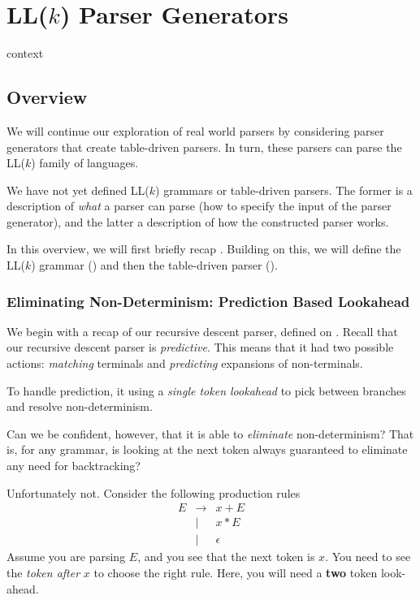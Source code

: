 \chapter{LL($k$) Parser Generators}\label{chapter:llk}

\begin{center}
    {context}
\end{center}

\section{Overview}
We will continue our exploration of real world parsers by considering parser generators that create table-driven parsers. In turn, these parsers can parse the LL($k$) family of languages. 

We have not yet defined LL($k$) grammars or table-driven parsers. The former is a description of \textit{what} a parser can parse (how to specify the input of the parser generator), and the latter a description of how the constructed parser works.

In this overview, we will first briefly recap . Building on this, we will define the LL($k$) grammar () and then the table-driven parser ().

\subsection{Eliminating Non-Determinism: Prediction Based Lookahead}\label{section:combinator-recap}
We begin with a recap of our recursive descent parser, defined on . Recall that our recursive descent parser is \textit{predictive}. This means that it had two possible actions: \textit{matching} terminals and \textit{predicting} expansions of non-terminals.

To handle prediction, it using a \textit{single token lookahead} to pick between branches and resolve non-determinism.

Can we be confident, however, that it is able to \textit{eliminate} non-determinism? That is, for any grammar, is looking at the next token always guaranteed to eliminate any need for backtracking? 

Unfortunately not. Consider the following production rules 
\[\begin{array}{rcl}
     E&\to&x+E  \\
     &\mid &x*E \\ 
     &\mid &\epsilon
\end{array}\]
Assume you are parsing $E$, and you see that the next token is $x$. You need to see the \textit{token after} $x$ to choose the right rule. Here, you will need a \textbf{two} token look-ahead.

